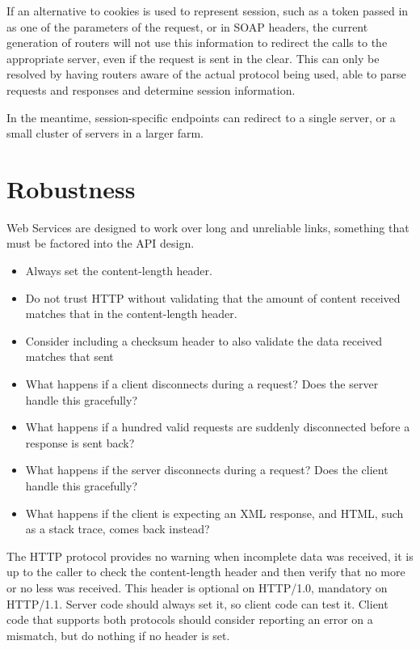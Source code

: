 \documentclass[draft]{report}
\begin{document}
If an alternative to cookies is used to represent session, such as a
token passed in as one of the parameters of the request, or in SOAP
headers, the current generation of routers will not use this information
to redirect the calls to the appropriate server, even if the request is
sent in the clear. This can only be resolved by having routers aware of
the actual protocol being used, able to parse requests and responses and
determine session information.

In the meantime, session-specific endpoints can redirect to a single
server, or a small cluster of servers in a larger farm.

\section{Robustness}

Web Services are designed to work over long and unreliable links,
something that must be factored into the API design.

\begin{itemize}

\item Always set the content-length header.

\item Do not trust HTTP without validating that the amount of content
received matches that in the content-length header.

\item Consider including a checksum header to also validate the data
received matches that sent

\item What happens if a client disconnects during a request? Does the
server handle this gracefully?

\item What happens if a hundred valid requests are suddenly disconnected
before a response is sent back?

\item What happens if the server disconnects during a request? Does the
client handle this gracefully?

\item What happens if the client is expecting an XML response, and HTML,
such as a stack trace, comes back instead?

\end{itemize}

The HTTP protocol provides no warning when incomplete data was received,
it is up to the caller to check the content-length header and then
verify that no more or no less was received. This header is optional on
HTTP/1.0, mandatory on HTTP/1.1. Server code should always set it, so
client code can test it. Client code that supports both protocols should
consider reporting an error on a mismatch, but do nothing if no header
is set.
\end{document}
